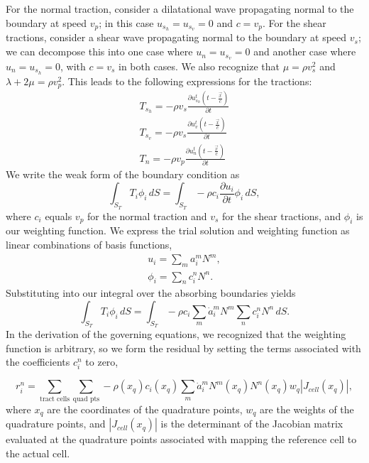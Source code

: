 For the normal traction, consider a dilatational wave propagating
normal to the boundary at speed $v_{p}$; in this case $u_{s_{h}}=u_{s_{v}}=0$
and $c=v_{p}$. For the shear tractions, consider a shear wave propagating
normal to the boundary at speed $v_{s}$; we can decompose this into
one case where $u_{n}=u_{s_{v}}=0$ and another case where $u_{n}=u_{s_{h}}=0$,
with $c=v_{s}$ in both cases. We also recognize that $\mu=\rho v_{s}^{2}$
and $\lambda+2\mu=\rho v_{p}^{2}$. This leads to the following expressions
for the tractions:
\begin{gather}
T_{s_{h}}=-\rho v_{s}\frac{\partial u_{s_{h}}^{t}(t-\frac{\vec{x}}{c})}{\partial t}\\
T_{s_{v}}=-\rho v_{s}\frac{\partial u_{v}^{t}(t-\frac{\vec{x}}{c})}{\partial t}\\
T_{n}=-\rho v_{p}\frac{\partial u_{n}^{t}(t-\frac{\vec{x}}{c})}{\partial t}
\end{gather}
We write the weak form of the boundary condition as
\[
\int_{S_{T}}T_{i}\phi_{i}\, dS=\int_{S_{T}}-\rho c_{i}\frac{\partial u_{i}}{\partial t}\phi_{i}\, dS,
\]
where $c_{i}$ equals $v_{p}$ for the normal traction and $v_{s}$
for the shear tractions, and $\phi_{i}$ is our weighting function.
We express the trial solution and weighting function as linear combinations
of basis functions,
\begin{gather}
u_{i}=\sum_{m}a_{i}^{m}N^{m},\\
\phi_{i}=\sum_{n}c_{i}^{n}N^{n}.
\end{gather}
Substituting into our integral over the absorbing boundaries yields
\begin{equation}
\int_{S_{T}}T_{i}\phi_{i}\, dS=\int_{S_{T}}-\rho c_{i}\sum_{m}\dot{a}_{i}^{m}N^{m}\sum_{n}c_{i}^{n}N^{n}\, dS.
\end{equation}
In the derivation of the governing equations, we recognized that the
weighting function is arbitrary, so we form the residual by setting
the terms associated with the coefficients $c_{i}^{n}$ to zero,

\begin{equation}
r_{i}^{n}=\sum_{\text{tract cells}}\sum_{\text{quad pts}}-\rho(x_{q})c_{i}(x_{q})\sum_{m}\dot{a}_{i}^{m}N^{m}(x_{q})N^{n}(x_{q})w_{q}|J_{cell}(x_{q})|,
\end{equation}
 where $x_{q}$ are the coordinates of the quadrature points, $w_{q}$
are the weights of the quadrature points, and $|J_{cell}(x_{q})|$
is the determinant of the Jacobian matrix evaluated at the quadrature
points associated with mapping the reference cell to the actual cell.

